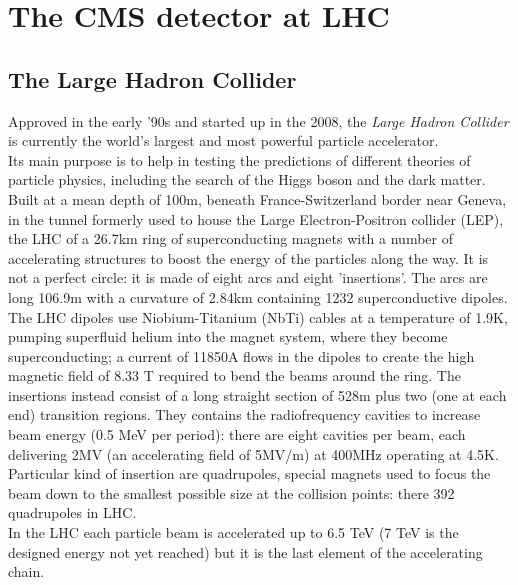 \chapter{The CMS detector at LHC}
\label{Chapter2}

\section{The Large Hadron Collider}
Approved in the early '90s and started up in the 2008, the \textit{Large Hadron Collider} is currently the world's largest and most powerful particle accelerator. \\
Its main purpose is to help in testing the predictions of different theories of particle physics, including the search of the Higgs boson and the dark matter. \\
Built at a mean depth of 100m, beneath France-Switzerland border near Geneva, in the tunnel formerly used to house the Large Electron-Positron collider (LEP), the LHC  of a 26.7km ring of superconducting magnets with a number of accelerating structures to boost the energy of the particles along the way. It is not a perfect circle: it is made of eight arcs and eight 'insertions'. The arcs are long 106.9m with a curvature of 2.84km containing 1232 superconductive dipoles. The LHC dipoles use Niobium-Titanium (NbTi) cables at a temperature of 1.9K, pumping superfluid helium into the magnet system, where they become superconducting; a current of 11850A flows in the dipoles to create the high magnetic field of 8.33 T required to bend the beams around the ring. 
The insertions instead consist of a long straight section of 528m plus two (one at each end) transition regions. They contains the radiofrequency cavities to increase beam energy (0.5 MeV per period): there are eight cavities per beam, each delivering 2MV (an accelerating field of 5MV/m) at 400MHz operating at 4.5K. Particular kind of insertion are quadrupoles, special magnets used to focus the beam down to the smallest possible size at the collision points: there 392 quadrupoles in LHC. \\
In the LHC each particle beam is accelerated up to 6.5 TeV (7 TeV is the designed energy not yet reached) but it is the last element of the accelerating chain. \\
